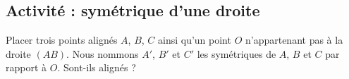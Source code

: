 
\subsection*{Activité : symétrique d'une droite}

Placer trois points alignés \( A\), \( B\), \( C\) ainsi qu'un point \( O\) n'appartenant pas à la droite \( (AB)\). Nous nommons \( A'\), \( B'\) et \( C'\) les symétriques de \( A\), \( B\) et \( C\) par rapport à \( O\). Sont-ils alignés ?
